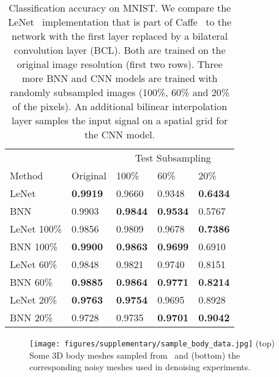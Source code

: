 \begin{table}[t]
  \begin{center}
    \footnotesize
    \centering
    \begin{tabular}[t]{lllll}
      \toprule
              &     & \multicolumn{3}{c}{Test Subsampling} \\
       Method  & Original & 100\% & 60\% & 20\%\\
      \midrule
       LeNet &  \textbf{0.9919} & 0.9660 & 0.9348 & \textbf{0.6434} \\
       BNN &  0.9903 & \textbf{0.9844} & \textbf{0.9534} & 0.5767 \\
      \hline
       LeNet 100\% & 0.9856 & 0.9809 & 0.9678 & \textbf{0.7386} \\
       BNN 100\% & \textbf{0.9900} & \textbf{0.9863} & \textbf{0.9699} & 0.6910 \\
      \hline
       LeNet 60\% & 0.9848 & 0.9821 & 0.9740 & 0.8151 \\
       BNN 60\% & \textbf{0.9885} & \textbf{0.9864} & \textbf{0.9771} & \textbf{0.8214}\\
      \hline
       LeNet 20\% & \textbf{0.9763} & \textbf{0.9754} & 0.9695 & 0.8928 \\
       BNN 20\% & 0.9728 & 0.9735 & \textbf{0.9701} & \textbf{0.9042}\\
      \bottomrule
    \end{tabular}
  \end{center}
\vspace{-.2cm}
\caption{Classification accuracy on MNIST. We compare the
    LeNet~\cite{lecun1998gradient} implementation that is part of
    Caffe~\cite{jia2014caffe} to the network with the first layer
    replaced by a bilateral convolution layer (BCL). Both are trained
    on the original image resolution (first two rows). Three more BNN
    and CNN models are trained with randomly subsampled images (100\%,
    60\% and 20\% of the pixels). An additional bilinear interpolation
    layer samples the input signal on a spatial grid for the CNN model.
  }
  \label{tab:all-results}
\vspace{-.3cm}
\end{table}

\begin{figure}[t!]
  \centering
    \texttt{[image: figures/supplementary/sample\_body\_data.jpg]}
  {(top) Some 3D body meshes sampled from~\cite{SMPL:2015} and (bottom) the corresponding noisy meshes used in denoising experiments.}
\label{fig:samplebody}
\end{figure}

